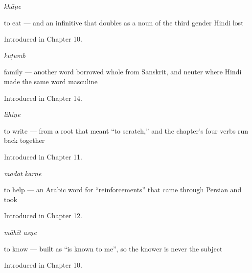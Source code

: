 \noindent\begin{minipage}[t]{\linewidth}
\raggedright
\textbf{}\enspace\emph{khāṇe}\par
\small to eat — and an infinitive that doubles as a noun of the third gender Hindi lost\par
\footnotesize Introduced in Chapter 10.
\end{minipage}\par\medskip

\noindent\begin{minipage}[t]{\linewidth}
\raggedright
\textbf{}\enspace\emph{kuṭumb}\par
\small family — another word borrowed whole from Sanskrit, and neuter where Hindi made the same word masculine\par
\footnotesize Introduced in Chapter 14.
\end{minipage}\par\medskip

\noindent\begin{minipage}[t]{\linewidth}
\raggedright
\textbf{}\enspace\emph{lihiṇe}\par
\small to write — from a root that meant \textquotedblleft{}to scratch,\textquotedblright{} and the chapter's four verbs run back together\par
\footnotesize Introduced in Chapter 11.
\end{minipage}\par\medskip

\noindent\begin{minipage}[t]{\linewidth}
\raggedright
\textbf{ }\enspace\emph{madat karṇe}\par
\small to help — an Arabic word for \textquotedblleft{}reinforcements\textquotedblright{} that came through Persian and took \par
\footnotesize Introduced in Chapter 12.
\end{minipage}\par\medskip

\noindent\begin{minipage}[t]{\linewidth}
\raggedright
\textbf{ }\enspace\emph{māhīt asṇe}\par
\small to know — built as \textquotedblleft{}is known to me\textquotedblright{}, so the knower is never the subject\par
\footnotesize Introduced in Chapter 10.
\end{minipage}\par\medskip

